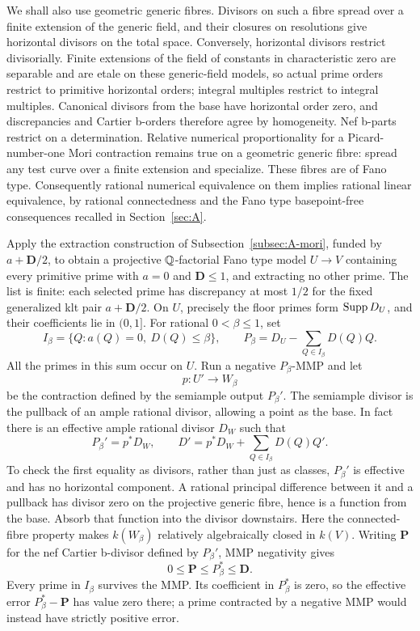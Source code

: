 We shall also use geometric generic fibres.  Divisors on such a fibre
spread over a finite extension of the generic field, and their closures
on resolutions give horizontal divisors on the total space.  Conversely,
horizontal divisors restrict divisorially.  Finite extensions of the
field of constants in characteristic zero are separable and are etale
on these generic-field models, so actual prime orders restrict to
primitive horizontal orders; integral multiples restrict to integral
multiples.  Canonical divisors from the base have horizontal order zero,
and discrepancies and Cartier b-orders therefore agree by homogeneity.
Nef b-parts restrict on a determination.  Relative numerical
proportionality for a Picard-number-one Mori contraction remains true on
a geometric generic fibre: spread any test curve over a finite extension
and specialize.  These fibres are of Fano type.  Consequently rational
numerical equivalence on them implies rational linear equivalence, by
rational connectedness and the Fano type basepoint-free consequences
recalled in Section~\ref{sec:A}.

Apply the extraction construction of Subsection~\ref{subsec:A-mori},
funded by $a+\mathbf D/2$, to obtain a projective $\mathbb Q$-factorial Fano
type model $U\to V$ containing every primitive prime with
$a=0$ and $\mathbf D\leq1$, and extracting no other prime.  The list
is finite: each selected prime has discrepancy at most $1/2$ for the
fixed generalized klt pair $a+\mathbf D/2$.  On $U$, precisely the
floor primes form $\operatorname{Supp} D_U$, and their coefficients lie in $(0,1]$.
For rational $0<\beta\leq1$, set
\begin{equation}\label{eq:C-cutoff}
 I_\beta=\{Q:a(Q)=0,\ D(Q)\leq\beta\},\qquad
 P_\beta=D_U-\sum_{Q\in I_\beta}D(Q)Q.
\end{equation}
All the primes in this sum occur on $U$.  Run a negative $P_\beta$-MMP
and let
\[
             p:U'\longrightarrow W_\beta
\]
be the contraction defined by the semiample output $P_\beta'$.  The
semiample divisor is the pullback of an ample rational divisor, allowing
a point as the base.  In fact there is an effective ample rational
divisor $D_W$ such that
\begin{equation}\label{eq:C-cutoff-pullback}
 P_\beta'=p^*D_W,\qquad
 D'=p^*D_W+\sum_{Q\in I_\beta}D(Q)Q'.
\end{equation}
To check the first equality as divisors, rather than just as classes,
$P_\beta'$ is effective and has no horizontal component.  A rational
principal difference between it and a pullback has divisor zero on the
projective generic fibre, hence is a function from the base.  Absorb
that function into the divisor downstairs.  Here the connected-fibre
property makes $k(W_\beta)$ relatively algebraically closed in $k(V)$.
Writing $\mathbf P$ for the nef Cartier b-divisor defined by
$P_\beta'$, MMP negativity gives
\begin{equation}\label{eq:C-cutoff-errors}
          0\leq\mathbf P\leq P_\beta^*\leq\mathbf D.
\end{equation}
Every prime in $I_\beta$ survives the MMP.  Its coefficient in
$P_\beta^*$ is zero, so the effective error
$P_\beta^*-\mathbf P$ has value zero there; a prime contracted by a
negative MMP would instead have strictly positive error.

